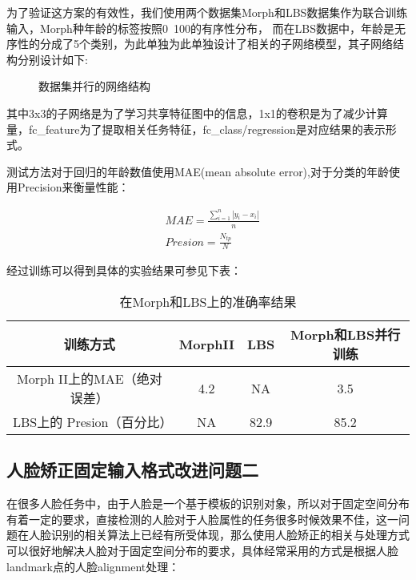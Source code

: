 为了验证这方案的有效性，我们使用两个数据集Morph和LBS数据集作为联合训练输入，Morph种年龄的标签按照0~100的有序性分布，
而在LBS数据中，年龄是无序性的分成了5个类别，为此单独为此单独设计了相关的子网络模型，其子网络结构分别设计如下:
 \begin{figure}[!ht]
 \centering
	\caption{数据集并行的网络结构}
\end{figure}

其中3x3的子网络是为了学习共享特征图中的信息，1x1的卷积是为了减少计算量，fc\_feature为了提取相关任务特征，fc\_class/regression是对应结果的表示形式。

测试方法对于回归的年龄数值使用MAE(mean absolute error),对于分类的年龄使用Precision来衡量性能：

\begin{equation}{
\begin{split}
& MAE=\frac{\sum_{i=1}^{n} \left | y_i-x_i \right |}{n}  \\
& Presion=\frac{N_{tp}}{N}
\end{split}
}\end{equation}

经过训练可以得到具体的实验结果可参见下表：
 \begin{table}[!h]
  \centering
   \caption{在Morph和LBS上的准确率结果}
   \label{tab:req-pkg}
   \begin{tabular}{c|c|c|c}
     \toprule
     训练方式&MorphII& LBS& Morph和LBS并行训练\\
     \midrule
     Morph II上的MAE（绝对误差）&4.2  &NA & 3.5 \\
     LBS上的 Presion（百分比）&NA  &82.9& 85.2\\
     \bottomrule
   \end{tabular}
 \end{table}

\subsection{人脸矫正固定输入格式改进问题二}
在很多人脸任务中，由于人脸是一个基于模板的识别对象，所以对于固定空间分布有着一定的要求，直接检测的人脸对于人脸属性的任务很多时候效果不佳，这一问题在人脸识别的相关算法上已经有所受体现，那么使用人脸矫正的相关与处理方式可以很好地解决人脸对于固定空间分布的要求，具体经常采用的方式是根据人脸landmark点的人脸alignment处理：

